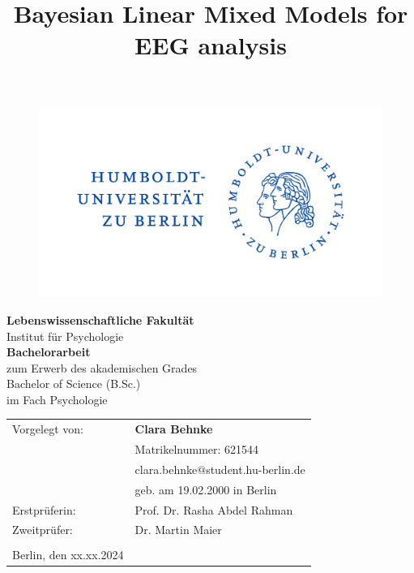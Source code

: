 \documentclass[
  doc,12pt,floatsintext]{apa7}
\title{Bayesian Linear Mixed Models for EEG analysis}
\author{\phantom{0}}
\date{}
\affiliation{\phantom{0}}
\begin{document}
\maketitle

\vspace{-20mm}
\begin{center}
\begin{figure}[h]
\begin{center}
\includegraphics[width=!,totalheight=!,scale=0.2]{hu_logo}
\end{center}
\end{figure}
\vspace*{5mm}
{
\textbf{Lebenswissenschaftliche Fakultät}\\
Institut für Psychologie\\
\vspace*{10mm}
}
{
\textbf{Bachelorarbeit}\\
zum Erwerb des akademischen Grades \\
Bachelor of Science (B.Sc.)\\
im Fach Psychologie\\
\vspace*{10mm}
}
\end{center}
\begin{flushleft}
{
\begin{tabular}{ll}
Vorgelegt von:&\textbf{Clara Behnke}\\
&Matrikelnummer: 621544\\
&clara.behnke$@$student.hu-berlin.de\\
&geb. am 19.02.2000 in Berlin\\
Erstprüferin:&Prof. Dr. Rasha Abdel Rahman\\
Zweitprüfer:&Dr. Martin Maier\\
&\\
Berlin, den xx.xx.2024&\\
\end{tabular}
}
\end{flushleft}
\end{document}
